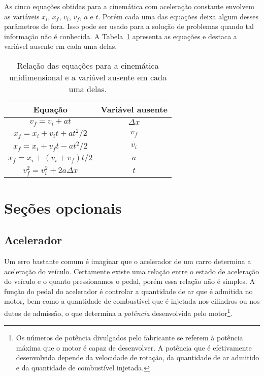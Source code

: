 As cinco equações obtidas para a cinemática com aceleração constante envolvem as variáveis $x_i$, $x_f$, $v_i$, $v_f$, $a$ e $t$. Porém cada uma das equações deixa algum desses parâmetros de fora. Isso pode ser usado para a solução de problemas quando tal informação não é conhecida. A Tabela~\ref{Tab:EqsCinematicasVarAusentes} apresenta as equações e destaca a variável ausente em cada uma delas.
\begin{table}[!h]
\centering
\begin{tabular}{cc}
\toprule
Equação & Variável ausente\\
\midrule
$v_f = v_i + at$ & $\Delta x$ \\
$x_f = x_i + v_i t + at^2 / 2$ & $v_f$ \\
$x_f = x_i + v_f t - at^2 / 2$ & $v_i$ \\
$x_f = x_i + (v_i + v_f) t / 2$ & $a$ \\
$v_f^2 = v_i^2 + 2 a \Delta x$ & $t$ \\
\bottomrule
\end{tabular}
\caption{Relação das equações para a cinemática unidimensional e a variável ausente em cada uma delas. \label{Tab:EqsCinematicasVarAusentes}}
\end{table}

\section{Seções opcionais}

\subsection{Acelerador}

Um erro bastante comum é imaginar que o acelerador de um carro determina a aceleração do veículo. Certamente existe uma relação entre o estado de aceleração do veículo e o quanto pressionamos o pedal, porém essa relação não é simples. A função do pedal do acelerador é controlar a quantidade de ar que é admitida no motor, bem como a quantidade de combustível que é injetada nos cilindros ou nos dutos de admissão, o que determina a \emph{potência} desenvolvida pelo motor\footnote{Os números de potência divulgados pelo fabricante se referem à potência máxima que o motor é capaz de desenvolver. A potência que é efetivamente desenvolvida depende da velocidade de rotação, da quantidade de ar admitido e da quantidade de combustível injetada.}.

